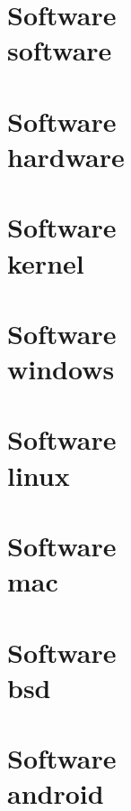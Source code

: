 \documentclass{WileySix}
\begin{document}
\chapter[Software]
{Software\\ software}


\chapter[Hardware]
{Software\\ hardware}


\chapter[Kernel]
{Software\\ kernel}



\chapter[Windows]
{Software\\ windows}


\chapter[Linux]
{Software\\ linux}


\chapter[Macintosh]
{Software\\ mac}


\chapter[Free BSD]
{Software\\ bsd}


\chapter[Android]
{Software\\ android}

\end{document}
